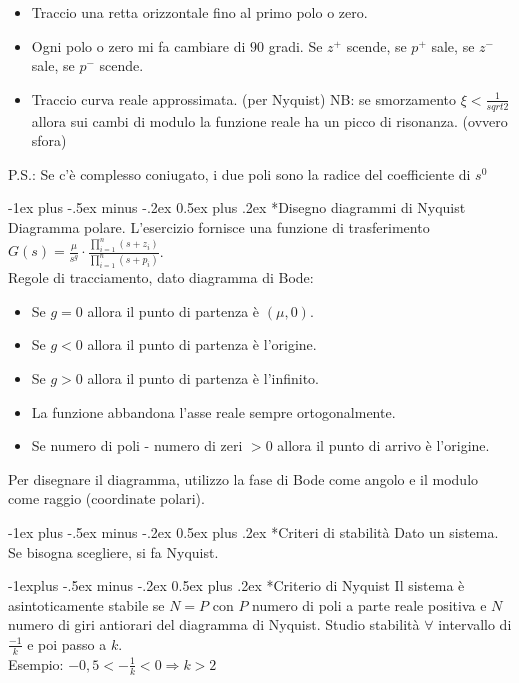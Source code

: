 \documentclass[10pt,landscape, a4paper]{scrartcl} %
\makeatletter
\renewcommand{\section}{\@startsection{section}{1}{0mm}%
                                {-1ex plus -.5ex minus -.2ex}%
                                {0.5ex plus .2ex}%
                                {\normalfont\large\bfseries}}
\renewcommand{\subsection}{\@startsection{subsection}{2}{0mm}%
                                {-1explus -.5ex minus -.2ex}%
                                {0.5ex plus .2ex}%
                                {\normalfont\normalsize\bfseries}}
\makeatother
\begin{document}
\begin{multicols*}{3}
\begin{enumerate}
\begin{itemize}
			\item Traccio una retta orizzontale fino al primo polo o zero.
			\item Ogni polo o zero mi fa cambiare di $90$ gradi. Se $z^+$ scende, se $p^+$ sale, se $z^-$ sale, se $p^-$ scende.
			\item Traccio curva reale approssimata. (per Nyquist)
					NB: se smorzamento $\xi < \frac{1}{sqrt{2}}$ allora sui cambi di modulo la funzione reale ha un picco di risonanza. (ovvero sfora)
		\end{itemize}
\end{enumerate}
P.S.: Se c'è complesso coniugato, i due poli sono la radice del coefficiente di $s^0$

\section*{Disegno diagrammi di Nyquist}
Diagramma polare. L'esercizio fornisce una funzione di trasferimento $G(s) = \frac{\mu}{s^g}\cdot \frac{\prod_{i=1}^{n} (s + z_i)}{\prod_{i=1}^{n} (s + p_i)}$.\\
Regole di tracciamento, dato diagramma di Bode:
\begin{itemize}
	\item Se $g = 0$ allora il punto di partenza è $(\mu,0)$.
	\item Se $g < 0$ allora il punto di partenza è l'origine.
	\item Se $g > 0$ allora il punto di partenza è l'infinito.
	\item La funzione abbandona l'asse reale sempre ortogonalmente.
	\item Se numero di poli - numero di zeri $>0$ allora il punto di arrivo è l'origine.
\end{itemize}
Per disegnare il diagramma, utilizzo la fase di Bode come angolo e il modulo come raggio (coordinate polari).

\section*{Criteri di stabilità} %
Dato un sistema. Se bisogna scegliere, si fa Nyquist.

\subsection*{Criterio di Nyquist}
Il sistema è asintoticamente stabile se $N = P$ con $P$
numero di poli a parte reale positiva e $N$ numero di giri antiorari del diagramma di Nyquist.
Studio stabilità $\forall$ intervallo di $\frac{-1}{k}$ e poi passo a $k$.\\
Esempio:
$-0,5 < -\frac{1}{k} < 0 \Rightarrow k > 2$


\end{multicols*}
\end{document}

